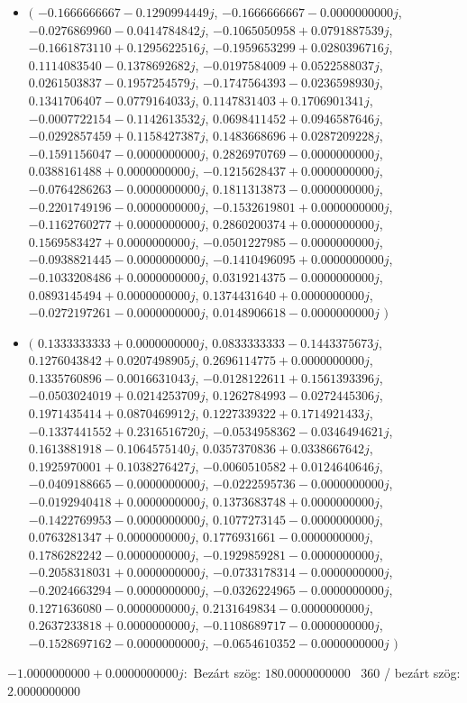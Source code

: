 \documentclass[14pt,a4paper]{article}
\begin{document}
\begin{itemize}
\item
$\big($
$-0.1666666667-0.1290994449j$, $-0.1666666667-0.0000000000j$, $-0.0276869960-0.0414784842j$, $-0.1065050958+0.0791887539j$, $-0.1661873110+0.1295622516j$, $-0.1959653299+0.0280396716j$, $0.1114083540-0.1378692682j$, $-0.0197584009+0.0522588037j$, $0.0261503837-0.1957254579j$, $-0.1747564393-0.0236598930j$, $0.1341706407-0.0779164033j$, $0.1147831403+0.1706901341j$, $-0.0007722154-0.1142613532j$, $0.0698411452+0.0946587646j$, $-0.0292857459+0.1158427387j$, $0.1483668696+0.0287209228j$, $-0.1591156047-0.0000000000j$, $0.2826970769-0.0000000000j$, $0.0388161488+0.0000000000j$, $-0.1215628437+0.0000000000j$, $-0.0764286263-0.0000000000j$, $0.1811313873-0.0000000000j$, $-0.2201749196-0.0000000000j$, $-0.1532619801+0.0000000000j$, $-0.1162760277+0.0000000000j$, $0.2860200374+0.0000000000j$, $0.1569583427+0.0000000000j$, $-0.0501227985-0.0000000000j$, $-0.0938821445-0.0000000000j$, $-0.1410496095+0.0000000000j$, $-0.1033208486+0.0000000000j$, $0.0319214375-0.0000000000j$, $0.0893145494+0.0000000000j$, $0.1374431640+0.0000000000j$, $-0.0272197261-0.0000000000j$, $0.0148906618-0.0000000000j$
$\big)$
\item
$\big($
$0.1333333333+0.0000000000j$, $0.0833333333-0.1443375673j$, $0.1276043842+0.0207498905j$, $0.2696114775+0.0000000000j$, $0.1335760896-0.0016631043j$, $-0.0128122611+0.1561393396j$, $-0.0503024019+0.0214253709j$, $0.1262784993-0.0272445306j$, $0.1971435414+0.0870469912j$, $0.1227339322+0.1714921433j$, $-0.1337441552+0.2316516720j$, $-0.0534958362-0.0346494621j$, $0.1613881918-0.1064575140j$, $0.0357370836+0.0338667642j$, $0.1925970001+0.1038276427j$, $-0.0060510582+0.0124640646j$, $-0.0409188665-0.0000000000j$, $-0.0222595736-0.0000000000j$, $-0.0192940418+0.0000000000j$, $0.1373683748+0.0000000000j$, $-0.1422769953-0.0000000000j$, $0.1077273145-0.0000000000j$, $0.0763281347+0.0000000000j$, $0.1776931661-0.0000000000j$, $0.1786282242-0.0000000000j$, $-0.1929859281-0.0000000000j$, $-0.2058318031+0.0000000000j$, $-0.0733178314-0.0000000000j$, $-0.2024663294-0.0000000000j$, $-0.0326224965-0.0000000000j$, $0.1271636080-0.0000000000j$, $0.2131649834-0.0000000000j$, $0.2637233818+0.0000000000j$, $-0.1108689717-0.0000000000j$, $-0.1528697162-0.0000000000j$, $-0.0654610352-0.0000000000j$
$\big)$
\end{itemize}
$-1.0000000000+0.0000000000j$:\
Bezárt szög: $180.0000000000$ \
360 / bezárt szög: $2.0000000000$\
\end{document}

